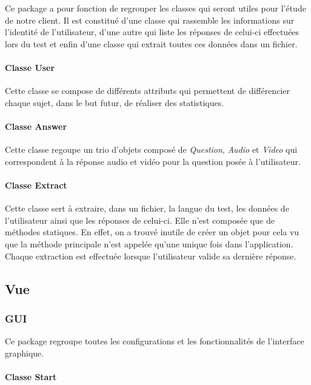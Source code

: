 Ce package a pour fonction de regrouper les classes qui seront utiles pour l'étude de notre client. Il est constitué d'une classe qui rassemble les informations sur l'identité de l'utilisateur, d'une autre qui liste les réponses de celui-ci effectuées lors du test et enfin d'une classe qui extrait toutes ces données dans un fichier.

\paragraph{Classe User}

Cette classe se compose de différents attributs qui permettent de différencier chaque sujet, dans le but futur, de réaliser des statistiques.

\paragraph{Classe Answer}

Cette classe regoupe un trio d'objets composé de \textit{Question}, \textit{Audio} et \textit{Video} qui correspondent à la réponse audio et vidéo pour la question posée à l'utilisateur.

\paragraph{Classe Extract}

Cette classe sert à extraire, dans un fichier, la langue du test, les données de l'utilisateur ainsi que les réponses de celui-ci. Elle n'est composée que de méthodes statiques. En effet, on a trouvé inutile de créer un objet pour cela vu que la méthode principale n'est appelée qu'une unique fois dans l'application. Chaque extraction est effectuée lorsque l'utilisateur valide sa dernière réponse.


\subsection{Vue}


\subsubsection{GUI}

Ce package regroupe toutes les configurations et les fonctionnalités de l'interface graphique.

\paragraph{Classe Start}

